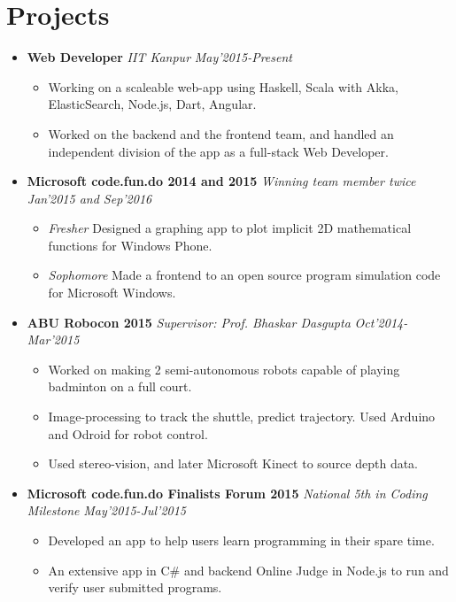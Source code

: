 \documentclass[11pt,a4paper]{moderncv}
\newcommand{\experience}[4]{
\vspace{0.1cm}
\item \textbf{\large{#1}} \emph{#2} \hfill \textit{#3}
  \begin{itemize}[leftmargin=*]
    \setlength\itemsep{0em} #4
  \end{itemize}
}
\newcommand{\onepage}[1]{
\ifdefined\onep
#1
\fi
}
\newcommand{\twopage}[1]{
\ifdefined\twop
#1
\fi
}
\newcommand{\secspace}{
\onepage{\vspace{-0.27cm}}
\twopage{\vspace{-0.1cm}}
}
\newcommand{\secbelow}{
\onepage{\vspace{-0.07cm}}
}
\begin{document}
\secspace
\section*{Projects}
\secbelow
\begin{itemize}
  \twopage{\setlength\itemsep{0.5em}}
\experience{Web Developer}{IIT Kanpur}{May'2015-Present}{
    \item Working on a scaleable web-app using Haskell, Scala with Akka, ElasticSearch, Node.js, Dart, Angular.
    \item Worked on the backend and the frontend team, and handled an independent division of the app as a full-stack Web Developer.
    }

\experience{Microsoft code.fun.do 2014 and 2015}{Winning team member twice}{Jan'2015 and Sep'2016}{
    \item \textit{Fresher} Designed a graphing app to plot implicit 2D mathematical functions for Windows Phone.
    \item \textit{Sophomore} Made a frontend to an open source program simulation code for Microsoft Windows.
    }

\experience{ABU Robocon 2015}{Supervisor: Prof. Bhaskar Dasgupta}{Oct'2014-Mar'2015}{
    \item Worked on making 2 semi-autonomous robots capable of playing badminton on a full court.
    \item Image-processing to track the shuttle, predict trajectory. Used Arduino and Odroid for robot control.
    \item Used stereo-vision, and later Microsoft Kinect to source depth data.
    }

\experience{Microsoft code.fun.do Finalists Forum 2015}{National 5th in Coding Milestone}{May'2015-Jul'2015}{
    \item Developed an app to help users learn programming in their spare time.
    \item An extensive app in C\# and backend Online Judge in Node.js to run and verify user submitted programs.
    }
    \end{itemize}

\secspace
\end{document}
